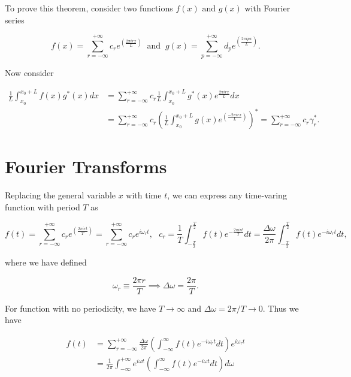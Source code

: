 \documentclass[english,a4paper,12pt]{report}
\begin{document}
To prove this theorem, consider two functions \(f(x) \text { and } g(x)\) with Fourier series 

\begin{equation}
    f(x) = \sum_{r=-\infty}^{+\infty} c_{r} e^{\left( \frac{2\pi irx}{L}  \right)} ~\text { and }~ g(x) = \sum_{p=-\infty}^{+\infty} d_{p} e^{\left( \frac{2\pi ipx}{L}  \right)}.      
\end{equation}

Now consider 

\begin{equation}
    \begin{aligned} 
    \frac{1}{L} \int_{x_0 }^{x_0 + L} f(x)g^*(x)dx &= \sum_{r=-\infty}^{+\infty} c_{r} \frac{1}{L} \int_{x_0 }^{x_0 + L} g^*(x) e^{\frac{2\pi irx}{L} }dx \\ &= \sum_{r=-\infty}^{+\infty} c_{r} \left( \frac{1}{L} \int_{x_0 }^{x_0 + L} g(x) e^{\left( \frac{-2\pi irx}{L}  \right)}   \right)^* = \sum_{r=-\infty}^{+\infty} c_{r} \gamma _{r}^*.            
    \end{aligned} 
\end{equation}

\section{Fourier Transforms}

Replacing the general variable \(x\) with time \(t\), we can express any time-varing function with period \(T\) as 

\begin{equation}
    f(t) = \sum_{r=-\infty}^{+\infty} c_{r} e^{\left( \frac{2\pi irt}{T}  \right)} = \sum_{r=-\infty}^{+\infty} c_{r} e^{i\omega _{r} t }, ~~~ c_{r} = \frac{1}{T} \int_{-\frac{T}{2} }^{\frac{T}{2} } f(t) e^{-\frac{2\pi irt}{T} }dt = \frac{\Delta \omega }{2\pi } \int_{-\frac{T}{2} }^{\frac{T}{2} } f(t) e^{-i \omega _{r} t} dt    ,        
\end{equation}

where we have defined 

\begin{equation}
    \omega _{r} \equiv \frac{2\pi r}{T} \implies \Delta \omega = \frac{2\pi }{T}.   
\end{equation}

For function with no periodicity, we have \(T \to \infty\) and \(\Delta \omega = 2\pi /T \to 0 \). Thus we have

\begin{equation}
    \begin{aligned} 
    f(t) &= \sum_{r=-\infty}^{+\infty} \frac{\Delta \omega }{2\pi } \left( \int_{-\infty}^{\infty } f(t) e^{- i \omega _{r} t} dt \right) e^{i \omega _{r} t} \\
    &= \frac{1}{2\pi } \int_{-\infty}^{+\infty} e^{i \omega t}  \left( \int_{-\infty}^{\infty } f(t) e^{- i \omega t} dt \right) d \omega 
    \end{aligned} 
\end{equation}
\end{document}
